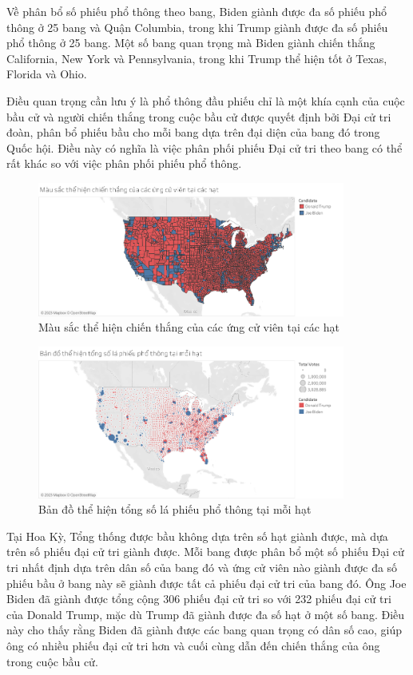 \documentclass[14pt, a4paper]{article}
\numberwithin{equation}{section}
\numberwithin{figure}{section}
\numberwithin{dl}{section}
\numberwithin{md}{section}
\numberwithin{bd}{section}
\numberwithin{dn}{section}
\numberwithin{hq}{section}
\begin{document}
    Về phân bổ số phiếu phổ thông theo bang, Biden giành được đa số phiếu phổ thông ở 25 bang và Quận Columbia, trong khi Trump giành được đa số phiếu phổ thông ở 25 bang. 
    Một số bang quan trọng mà Biden giành chiến thắng California, New York và Pennsylvania, trong khi Trump thể hiện tốt ở Texas, Florida và Ohio.

    Điều quan trọng cần lưu ý là phổ thông đầu phiếu chỉ là một khía cạnh của cuộc bầu cử và người chiến thắng trong cuộc bầu cử được quyết định bởi Đại cử tri đoàn, phân bổ phiếu bầu cho mỗi bang dựa trên đại diện của bang đó trong Quốc hội. 
    Điều này có nghĩa là việc phân phối phiếu Đại cử tri theo bang có thể rất khác so với việc phân phối phiếu phổ thông.

    \begin{figure}[h!]
        \centering
        \includegraphics[width=0.9\textwidth]{County_Candidate_Win.png}
        \caption{Màu sắc thể hiện chiến thắng của các ứng cử viên tại các hạt}
    \end{figure}

    \begin{figure}[h!]
        \centering
        \includegraphics[width=0.9\textwidth]{County_Total_Vote_Circle.png}
        \caption{Bản đồ thể hiện tổng số lá phiếu phổ thông tại mỗi hạt}
    \end{figure}

    Tại Hoa Kỳ, Tổng thống được bầu không dựa trên số hạt giành được, mà dựa trên số phiếu đại cử tri giành được. 
    Mỗi bang được phân bổ một số phiếu Đại cử tri nhất định dựa trên dân số của bang đó và ứng cử viên nào giành được đa số phiếu bầu ở bang này sẽ giành được tất cả phiếu đại cử tri của bang đó.
    Ông Joe Biden đã giành được tổng cộng 306 phiếu đại cử tri so với 232 phiếu đại cử tri của Donald Trump, mặc dù Trump đã giành được đa số hạt ở một số bang. 
    Điều này cho thấy rằng Biden đã giành được các bang quan trọng có dân số cao, giúp ông có nhiều phiếu đại cử tri hơn và cuối cùng dẫn đến chiến thắng của ông trong cuộc bầu cử.
\end{document}
